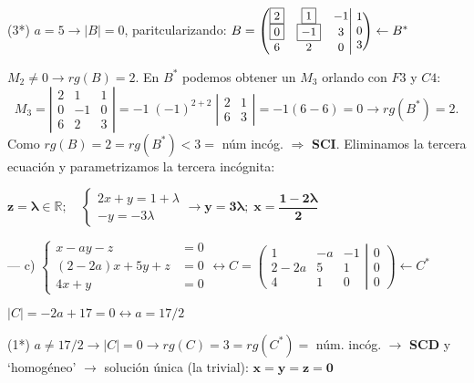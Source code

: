 \begin{proofw}
\noindent (3*) $a=5 \to |B|=0$, paritcularizando: $B=\small{\left( \begin{matrix}    \boxed{2}&\boxed{1}&-1\\\boxed{0}&\boxed{-1}&3\\6&2&0    \end{matrix} \right|  \left.    \begin{matrix} 1\\0\\3   \end{matrix} \right)} \leftarrow B^*$

\noindent \normalsize{$\boxed{M_2}\neq 0 \to rg(B)=2$. En $B^*$ podemos obtener un $M_3$ orlando con $F3$ y $C4$: $\; \; M_3=\left| \begin{matrix} 2&1&1\\0&-1&0\\6&2&3 \end{matrix} \right| = -1\; (-1)^{2+2}\; \left| \begin{matrix} 2&1\\6&3 \end{matrix} \right|=-1 (6-6)= 0 \to rg(B^*)=2$}. Como $rg(B)=2 = rg(B^*)<3=$ núm incóg.  $\Rightarrow $ \textbf{SCI}. Eliminamos la tercera ecuación y parametrizamos la tercera incógnita: 

\noindent $\boldsymbol{z=\lambda \in \mathbb R}; \quad \begin{cases} 2x+y=1+\lambda \\ -y=-3\lambda  \end{cases} \to \boldsymbol{y=3\lambda}; \; \boldsymbol{x= \dfrac{1-2\lambda}{2}}$


\noindent --- c) $\begin{cases} x-ay-z&=0\\(2-2a)x+5y+z&=0\\4x+y&=0    \end{cases} \leftrightarrow C=\left( \begin{matrix}  1&-a&-1\\2-2a&5&1\\4&1&0      \end{matrix} \right|  \left.    \begin{matrix}   0\\0\\0 \end{matrix} \right) \leftarrow C^*$

\noindent $|C|=-2a+17=0 \leftrightarrow a=17/2$

\noindent (1*) $a\neq 17/2 \to |C|=0 \to rg(C)=3=rg(C^*)=$ núm. incóg. $\to$ \textbf{SCD} y `homogéneo' $\to $ solución única (la trivial): $\boldsymbol{x=y=z=0}$


\end{proofw}
